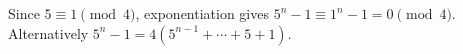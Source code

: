 Since $ 5\equiv1\pmod4 $, exponentiation gives $ 5^n-1\equiv1^n-1=0\pmod4 $. Alternatively $ 5^n-1=4(5^{n-1}+\cdots+5+1)$.
